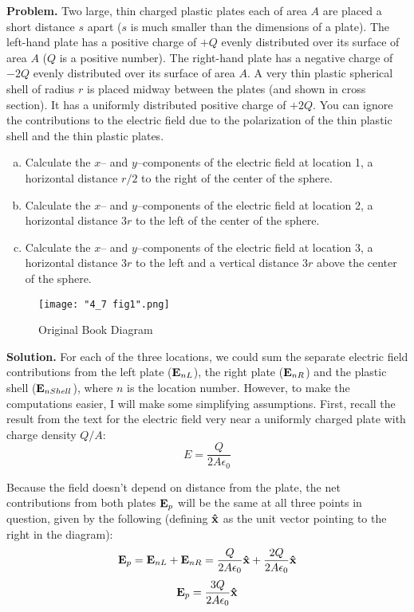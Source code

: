 \documentclass{article}
\begin{document}
\insertTitle

\textbf{Problem.} Two large, thin charged plastic plates each of area $A$ are placed a short distance $s$ apart ($s$ is much smaller than the dimensions of a plate). The left-hand plate has a positive charge of $+Q$ evenly distributed over its surface of area $A$ ($Q$ is a positive number). The right-hand plate has a negative charge of $-2Q$ evenly distributed over its surface of area $A$. A very thin plastic spherical shell of radius $r$ is placed midway between the plates (and shown in cross section). It has a uniformly distributed positive charge of $+2Q$. You can ignore the contributions to the electric field due to the polarization of the thin plastic shell and the thin plastic plates.
\begin{enumerate}[(a)]
    \item Calculate the $x$-- and $y$--components of the electric field at location 1, a horizontal distance $r/2$ to the right of the center of the sphere.

    \item Calculate the $x$-- and $y$--components of the electric field at location 2, a horizontal distance $3r$ to the left of the center of the sphere.

    \item Calculate the $x$-- and $y$--components of the electric field at location 3, a horizontal distance $3r$ to the left and a vertical distance $3r$ above the center of the sphere.
\end{enumerate}

\begin{figure}[H]
\centering
\texttt{[image: "4\_7 fig1".png]}
\caption{Original Book Diagram \label{3figure}}
\end{figure}

\textbf{Solution.} For each of the three locations, we could sum the separate electric field contributions from the left plate ($\vb{E}_{nL}$), the right plate ($\vb{E}_{nR}$) and the plastic shell ($\vb{E}_{nShell}$), where $n$ is the location number. However, to make the computations easier, I will make some simplifying assumptions. First, recall the result from the text for the electric field very near a uniformly charged plate with charge density $Q/A$:
\begin{equation}
E = \frac{Q}{2A\epsilon_0}
\end{equation}

Because the field doesn't depend on distance from the plate, the net contributions from both plates $\vb{E}_p$ will be the same at all three points in question, given by the following (defining $\vu{x}$ as the unit vector pointing to the right in the diagram):
\begin{equation*}
\vb{E}_p = \vb{E}_{nL} + \vb{E}_{nR} = \frac{Q}{2A\epsilon_0}\vu{x} + \frac{2Q}{2A\epsilon_0}\vu{x}
\end{equation*}
\begin{equation}
\vb{E}_p = \frac{3Q}{2A\epsilon_0}\vu{x}
\end{equation}
\end{document}
